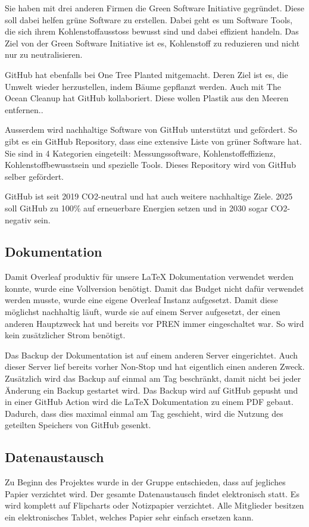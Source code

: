 Sie haben mit drei anderen Firmen die Green Software Initiative gegründet. Diese soll dabei helfen grüne Software zu erstellen.  Dabei geht es um Software Tools, die sich ihrem Kohlenstoffausstoss bewusst sind und dabei effizient handeln. Das Ziel von der Green Software Initiative ist es, Kohlenstoff zu reduzieren und nicht nur zu neutralisieren.\cite{green-software-initiative}

GitHub hat ebenfalls bei One Tree Planted mitgemacht. Deren Ziel ist es, die Umwelt wieder herzustellen, indem Bäume gepflanzt werden\cite{one-tree-planted}. Auch mit The Ocean Cleanup hat GitHub kollaboriert. Diese wollen Plastik aus den Meeren entfernen.\cite{ocean-cleanup}.

Ausserdem wird nachhaltige Software von GitHub unterstützt und gefördert. So gibt es ein GitHub Repository, dass eine extensive Liste von grüner Software hat. Sie sind in 4 Kategorien eingeteilt: Messungssoftware, Kohlenstoffeffizienz, Kohlenstoffbewusstsein und spezielle Tools. Dieses Repository wird von GitHub selber gefördert.\cite{green-software}

GitHub ist seit 2019 CO2-neutral und hat auch weitere nachhaltige Ziele. 2025 soll GitHub zu 100\% auf erneuerbare Energien setzen und in 2030 sogar CO2-negativ sein.\cite{github-goals}







\subsection{Dokumentation}

Damit Overleaf produktiv für unsere LaTeX Dokumentation verwendet werden konnte, wurde eine Vollversion benötigt. Damit das Budget nicht dafür verwendet werden musste, wurde eine eigene Overleaf Instanz aufgesetzt. Damit diese möglichst nachhaltig läuft, wurde sie auf einem Server aufgesetzt, der einen anderen Hauptzweck hat und bereits vor PREN immer eingeschaltet war. So wird kein zusätzlicher Strom benötigt.

Das Backup der Dokumentation ist auf einem anderen Server eingerichtet. Auch dieser Server lief bereits vorher Non-Stop und hat eigentlich einen anderen Zweck. Zusätzlich wird das Backup auf einmal am Tag beschränkt, damit nicht bei jeder Änderung ein Backup gestartet wird. Das Backup wird auf GitHub gepusht und in einer GitHub Action wird die LaTeX Dokumentation zu einem PDF gebaut. Dadurch, dass dies maximal einmal am Tag geschieht, wird die Nutzung des geteilten Speichers von GitHub gesenkt.

\subsection{Datenaustausch}

Zu Beginn des Projektes wurde in der Gruppe entschieden, dass auf jegliches Papier verzichtet wird. Der gesamte Datenaustausch findet elektronisch statt. Es wird komplett auf Flipcharts oder Notizpapier verzichtet. Alle Mitglieder besitzen ein elektronisches Tablet, welches Papier sehr einfach ersetzen kann.
